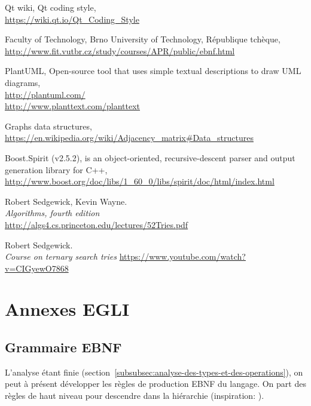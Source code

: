\documentclass[french]{article}
\begin{document}
			\listoffigures
			
			\begin{thebibliography}{9}
				Qt wiki, Qt coding style,\\ \url{https://wiki.qt.io/Qt_Coding_Style}
				
				Faculty of Technology, Brno University of Technology, République tchèque,\\ \url{http://www.fit.vutbr.cz/study/courses/APR/public/ebnf.html}
				
				PlantUML, Open-source tool that uses simple textual descriptions to draw UML diagrams,\\ \url{http://plantuml.com/}\\ \url{http://www.planttext.com/planttext}
				
				Graphs data structures,\\ \url{https://en.wikipedia.org/wiki/Adjacency_matrix#Data_structures}
				
				Boost.Spirit (v2.5.2), is an object-oriented, recursive-descent parser and output generation library for C++,\\ \url{http://www.boost.org/doc/libs/1_60_0/libs/spirit/doc/html/index.html}
				
				Robert Sedgewick, Kevin Wayne.\\
				\emph{Algorithms, fourth edition}\\
				\url{http://algs4.cs.princeton.edu/lectures/52Tries.pdf}
				
				Robert Sedgewick.\\
				\emph{Course on ternary search tries}
				\url{https://www.youtube.com/watch?v=CIGyewO7868}
			\end{thebibliography}
			
	\newpage
	\section{Annexes EGLI}
	\label{sec:annexes-egli}
	
		\subsection{Grammaire EBNF} 
		L'analyse étant finie (section~\ref{subsubsec:analyse-des-types-et-des-operations}), on peut à présent développer les règles de production EBNF du langage. On part des règles de haut niveau pour descendre dans la hiérarchie (inspiration: \cite{vutbr.cz}).\\
		
\end{document}
